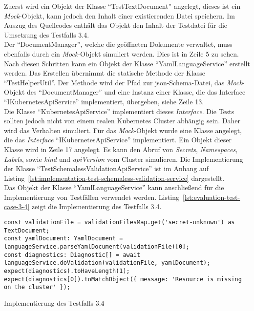 Zuerst wird ein Objekt der Klasse ``TestTextDocument'' angelegt, dieses ist ein \textit{Mock}-Objekt, kann jedoch den Inhalt einer
existierenden Datei speichern. Im Auszug des Quellcodes enthält das Objekt den Inhalt der Testdatei für die Umsetzung des Testfalls 3.4.
\\
Der ``DocumentManager'', welche die geöffneten Dokumente verwaltet, muss ebenfalls durch ein \textit{Mock}-Objekt simuliert werden.
Dies ist in Zeile 5 zu sehen. Nach diesen Schritten kann ein Objekt der Klasse ``YamlLanguageService'' erstellt werden.
Das Erstellen übernimmt die statische Methode der Klasse ``TestHelperUtil''. Der Methode wird der Pfad zur \ac{json}-Schema-Datei, das \textit{Mock}-Objekt des
``DocumentManager'' und eine Instanz einer Klasse, die das Interface ``IKubernetesApiService'' implementiert, übergeben, siehe Zeile 13.
\\
Die Klasse ``KubernetesApiService'' implementiert dieses \textit{Interface}.
Die Tests sollten jedoch nicht von einem realen Kubernetes Cluster abhängig sein.
Daher wird das Verhalten simuliert.
Für das \textit{Mock}-Objekt wurde eine Klasse angelegt, die das \textit{Interface} ``IKubernetesApiService'' implementiert.
Ein Objekt dieser Klasse wird in Zeile 17 angelegt.
Es kann den Abruf von \textit{Secrets}, \textit{Namespaces}, \textit{Labels}, sowie \textit{kind} und \textit{apiVersion} vom Cluster simulieren.
Die Implementierung der Klasse ``TestSchemalessValidationApiService'' ist im Anhang
auf Listing~\ref{lst:implementation-test-schemaless-validation-service} dargestellt.
\\
Das Objekt der Klasse ``YamlLanguageService'' kann anschließend für die Implementierung von Testfällen verwendet werden.
Listing~\ref{lst:evaluation-test-case-3-4} zeigt die Implementierung des Testfalls 3.4.

\newpage

\begin{listing}[htp]
    \begin{verbatim}
const validationFile = validationFilesMap.get('secret-unknown') as TextDocument;
const yamlDocument: YamlDocument = languageService.parseYamlDocument(validationFile)[0];
const diagnostics: Diagnostic[] = await languageService.doValidation(validationFile, yamlDocument);
expect(diagnostics).toHaveLength(1);
expect(diagnostics[0]).toMatchObject({ message: 'Resource is missing on the cluster' });
  \end{verbatim}
    \caption{Implementierung des Testfalls 3.4}
    \label{lst:evaluation-test-case-3-4}
\end{listing}

